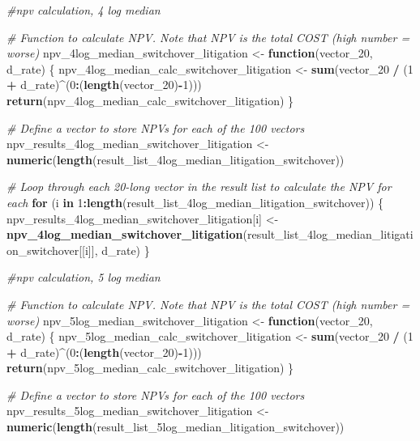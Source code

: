 \documentclass[
]{article}
\newenvironment{Shaded}{\begin{snugshade}}{\end{snugshade}}
\newcommand{\CommentTok}[1]{\textcolor[rgb]{0.56,0.35,0.01}{\textit{#1}}}
\newcommand{\ControlFlowTok}[1]{\textcolor[rgb]{0.13,0.29,0.53}{\textbf{#1}}}
\newcommand{\DecValTok}[1]{\textcolor[rgb]{0.00,0.00,0.81}{#1}}
\newcommand{\FunctionTok}[1]{\textcolor[rgb]{0.13,0.29,0.53}{\textbf{#1}}}
\newcommand{\NormalTok}[1]{#1}
\newcommand{\OtherTok}[1]{\textcolor[rgb]{0.56,0.35,0.01}{#1}}
\newcommand{\SpecialCharTok}[1]{\textcolor[rgb]{0.81,0.36,0.00}{\textbf{#1}}}
\begin{document}
\begin{Shaded}
\begin{Highlighting}[]
\CommentTok{\#npv calculation, 4 log median}


\CommentTok{\# Function to calculate NPV. Note that NPV is the total COST (high number = worse)}
\NormalTok{npv\_4log\_median\_switchover\_litigation }\OtherTok{\textless{}{-}} \ControlFlowTok{function}\NormalTok{(vector\_20, d\_rate) \{}
\NormalTok{  npv\_4log\_median\_calc\_switchover\_litigation }\OtherTok{\textless{}{-}} \FunctionTok{sum}\NormalTok{(vector\_20 }\SpecialCharTok{/}\NormalTok{ (}\DecValTok{1} \SpecialCharTok{+}\NormalTok{ d\_rate)}\SpecialCharTok{\^{}}\NormalTok{(}\DecValTok{0}\SpecialCharTok{:}\NormalTok{(}\FunctionTok{length}\NormalTok{(vector\_20)}\SpecialCharTok{{-}}\DecValTok{1}\NormalTok{)))}
  \FunctionTok{return}\NormalTok{(npv\_4log\_median\_calc\_switchover\_litigation)}
\NormalTok{\}}

\CommentTok{\# Define a vector to store NPVs for each of the 100 vectors}
\NormalTok{npv\_results\_4log\_median\_switchover\_litigation }\OtherTok{\textless{}{-}} \FunctionTok{numeric}\NormalTok{(}\FunctionTok{length}\NormalTok{(result\_list\_4log\_median\_litigation\_switchover))}

\CommentTok{\# Loop through each 20{-}long vector in the result list to calculate the NPV for each}
\ControlFlowTok{for}\NormalTok{ (i }\ControlFlowTok{in} \DecValTok{1}\SpecialCharTok{:}\FunctionTok{length}\NormalTok{(result\_list\_4log\_median\_litigation\_switchover)) \{}
\NormalTok{  npv\_results\_4log\_median\_switchover\_litigation[i] }\OtherTok{\textless{}{-}} \FunctionTok{npv\_4log\_median\_switchover\_litigation}\NormalTok{(result\_list\_4log\_median\_litigation\_switchover[[i]], d\_rate)}
\NormalTok{\}}


\CommentTok{\#npv calculation, 5 log median}


\CommentTok{\# Function to calculate NPV. Note that NPV is the total COST (high number = worse)}
\NormalTok{npv\_5log\_median\_switchover\_litigation }\OtherTok{\textless{}{-}} \ControlFlowTok{function}\NormalTok{(vector\_20, d\_rate) \{}
\NormalTok{  npv\_5log\_median\_calc\_switchover\_litigation }\OtherTok{\textless{}{-}} \FunctionTok{sum}\NormalTok{(vector\_20 }\SpecialCharTok{/}\NormalTok{ (}\DecValTok{1} \SpecialCharTok{+}\NormalTok{ d\_rate)}\SpecialCharTok{\^{}}\NormalTok{(}\DecValTok{0}\SpecialCharTok{:}\NormalTok{(}\FunctionTok{length}\NormalTok{(vector\_20)}\SpecialCharTok{{-}}\DecValTok{1}\NormalTok{)))}
  \FunctionTok{return}\NormalTok{(npv\_5log\_median\_calc\_switchover\_litigation)}
\NormalTok{\}}

\CommentTok{\# Define a vector to store NPVs for each of the 100 vectors}
\NormalTok{npv\_results\_5log\_median\_switchover\_litigation }\OtherTok{\textless{}{-}} \FunctionTok{numeric}\NormalTok{(}\FunctionTok{length}\NormalTok{(result\_list\_5log\_median\_litigation\_switchover))}


\end{Highlighting}
\end{Shaded}
\end{document}
